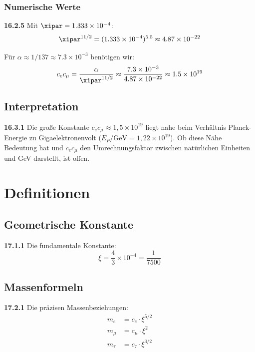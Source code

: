\subsubsection{Numerische Werte}
\noindent \textbf{16.2.5} Mit $\xipar = 1.333 \times 10^{-4}$:
\begin{equation}
	\xipar^{11/2} = (1.333 \times 10^{-4})^{5.5} \approx 4.87 \times 10^{-22}
\end{equation}

Für $\alpha \approx 1/137 \approx 7.3 \times 10^{-3}$ benötigen wir:
\begin{equation}
	c_e c_\mu = \frac{\alpha}{\xipar^{11/2}} \approx \frac{7.3 \times 10^{-3}}{4.87 \times 10^{-22}} \approx 1.5 \times 10^{19}
\end{equation}

\subsection{Interpretation}
\noindent \textbf{16.3.1} Die große Konstante $c_e c_\mu \approx 1{,}5\times10^{19}$ liegt nahe beim Verhältnis Planck-Energie zu Gigaelektronenvolt ($E_P/\text{GeV} = 1{,}22\times10^{19}$). Ob diese Nähe Bedeutung hat und $c_e c_\mu$ den Umrechnungsfaktor zwischen natürlichen Einheiten und GeV darstellt, ist offen.

\section{Definitionen}

\subsection{Geometrische Konstante}
\noindent \textbf{17.1.1} Die fundamentale Konstante:
\begin{equation}
	\xi = \frac{4}{3} \times 10^{-4} = \frac{1}{7500}
\end{equation}

\subsection{Massenformeln}
\noindent \textbf{17.2.1} Die präzisen Massenbeziehungen:
\begin{align}
	m_e &= c_e \cdot \xi^{5/2} \\
	m_\mu &= c_\mu \cdot \xi^2 \\
	m_\tau &= c_\tau \cdot \xi^{3/2}
\end{align}

